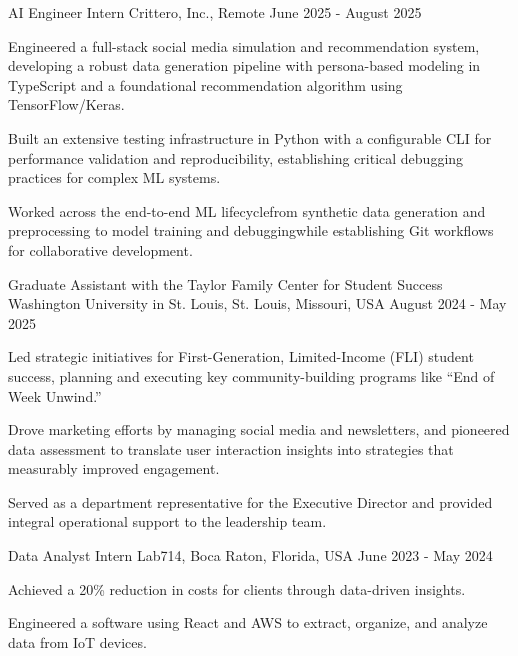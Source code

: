 \documentclass[10pt, letterpaper]{article}
\begin{document}
\vspace{\entrySpacing}
\begin{experienceentry}
  {AI Engineer Intern} %
  {Crittero, Inc., Remote} %
  {June 2025 - August 2025} %
  \item Engineered a full-stack social media simulation and recommendation system, developing a robust data generation pipeline with persona-based modeling in TypeScript and a foundational recommendation algorithm using TensorFlow/Keras.
  \item Built an extensive testing infrastructure in Python with a configurable CLI for performance validation and reproducibility, establishing critical debugging practices for complex ML systems.
  \item Worked across the end-to-end ML lifecycle\textemdash from synthetic data generation and preprocessing to model training and debugging\textemdash while establishing Git workflows for collaborative development.
\end{experienceentry}

\vspace{\entrySpacing}
\begin{experienceentry}
  {Graduate Assistant with the Taylor Family Center for Student Success} %
  {Washington University in St. Louis, St. Louis, Missouri, USA} %
  {August 2024 - May 2025} %
  \item Led strategic initiatives for First-Generation, Limited-Income (FLI) student success, planning and executing key community-building programs like ``End of Week Unwind.''
  \item Drove marketing efforts by managing social media and newsletters, and pioneered data assessment to translate user interaction insights into strategies that measurably improved engagement.
  \item Served as a department representative for the Executive Director and provided integral operational support to the leadership team.
\end{experienceentry}

\vspace{\entrySpacing}
\begin{experienceentry}
  {Data Analyst Intern} %
  {Lab714, Boca Raton, Florida, USA} %
  {June 2023 - May 2024} %
  \item Achieved a 20\% reduction in costs for clients through data-driven insights.
  \item Engineered a software using React and AWS to extract, organize, and analyze data from IoT devices.
\end{experienceentry}
\end{document}
